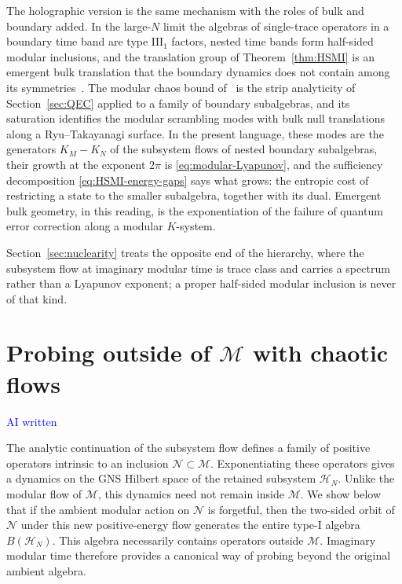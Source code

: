 \documentclass[a4paper,11pt]{article}
\theoremstyle{definition}
\newcommand{\mN}{\mathcal{N}}
\newcommand{\lb}{\left(}
\newcommand{\rb}{\right)}
\newcommand{\mH}{\mathcal{H}}
\newcommand{\mM}{\mathcal{M}}
\newcommand{\NL}[1]{\textcolor{blue}{#1}}
\begin{document}
The holographic version is the same mechanism with the roles of bulk and boundary added. In the large-$N$ limit the algebras of single-trace operators in a boundary time band are type $\mathrm{III}_1$ factors, nested time bands form half-sided modular inclusions, and the translation group of Theorem~\ref{thm:HSMI} is an emergent bulk translation that the boundary dynamics does not contain among its symmetries~\cite{LeutheusserLiu2023}. The modular chaos bound of~\cite{deBoerLamprou2020} is the strip analyticity of Section~\ref{sec:QEC} applied to a family of boundary subalgebras, and its saturation identifies the modular scrambling modes with bulk null translations along a Ryu--Takayanagi surface. In the present language, these modes are the generators $K_M-K_N$ of the subsystem flows of nested boundary subalgebras, their growth at the exponent $2\pi$ is \eqref{eq:modular-Lyapunov}, and the sufficiency decomposition \eqref{eq:HSMI-energy-gaps} says what grows: the entropic cost of restricting a state to the smaller subalgebra, together with its dual. Emergent bulk geometry, in this reading, is the exponentiation of the failure of quantum error correction along a modular $K$-system.

Section~\ref{sec:nuclearity} treats the opposite end of the hierarchy, where the subsystem flow at imaginary modular time is trace class and carries a spectrum rather than a Lyapunov exponent; a proper half-sided modular inclusion is never of that kind.





\section{Probing outside of $\mathcal M$ with chaotic flows}
\label{sec:probing-outside-M}

\NL{AI written}

The analytic continuation of the subsystem flow defines a family of positive
operators intrinsic to an inclusion $\mN\subset \mM$. Exponentiating these operators gives a dynamics on the GNS
Hilbert space of the retained subsystem $\mH_N$. Unlike the modular flow of
$\mathcal M$, this dynamics need not remain inside $\mathcal M$. We show
below that if the ambient modular action on $\mathcal N$ is forgetful, then
the two-sided orbit of $\mathcal N$ under this new positive-energy flow
generates the entire type-I algebra $B(\mathcal H_N)$. This algebra necessarily
contains operators outside $\mathcal M$. Imaginary modular time therefore
provides a canonical way of probing beyond the original ambient algebra.
\end{document}
